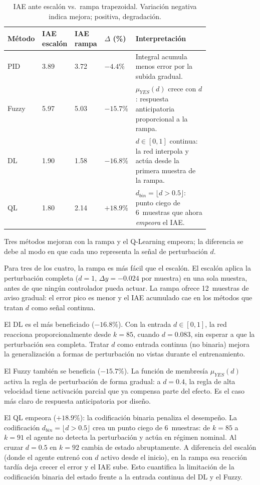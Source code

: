 \begin{table}[H]
\centering
\small
\caption{IAE ante escalón vs.\ rampa trapezoidal. Variación negativa indica mejora; positiva, degradación.}
\label{tab:robustez_rampa}
\begin{tabular}{@{}P{0.10\linewidth}P{0.12\linewidth}P{0.12\linewidth}P{0.10\linewidth}P{0.36\linewidth}@{}}
\toprule
Método & IAE escalón & IAE rampa & $\Delta$ (\%) & Interpretación \\ \midrule
PID   & 3.89 & 3.72 & $-4.4\%$  & Integral acumula menos error por la subida gradual. \\
Fuzzy & 5.97 & 5.03 & $-15.7\%$ & $\mu_{YES}(d)$ crece con $d$: respuesta anticipatoria proporcional a la rampa.\\
DL    & 1.90 & 1.58 & $-16.8\%$ & $d\in[0,1]$ continua: la red interpola y actúa desde la primera muestra de la rampa.\\
QL    & 1.80 & 2.14 & $+18.9\%$ & $d_{bin}=\lfloor d{>}0.5\rfloor$: punto ciego de 6~muestras que ahora \emph{empeora} el IAE.\\
\bottomrule
\end{tabular}
\end{table}

Tres métodos mejoran con la rampa y el Q-Learning empeora; la diferencia se debe al modo en que cada uno representa la señal de perturbación $d$.

Para tres de los cuatro, la rampa es más fácil que el escalón. El escalón aplica la perturbación completa ($d=1$, $\Delta y=-0.024$ por muestra) en una sola muestra, antes de que ningún controlador pueda actuar. La rampa ofrece 12~muestras de aviso gradual: el error pico es menor y el IAE acumulado cae en los métodos que tratan $d$ como señal continua.

El DL es el más beneficiado ($-16.8\%$). Con la entrada $d\in[0,1]$, la red reacciona proporcionalmente desde $k=85$, cuando $d=0.083$, sin esperar a que la perturbación sea completa. Tratar $d$ como entrada continua (no binaria) mejora la generalización a formas de perturbación no vistas durante el entrenamiento.

El Fuzzy también se beneficia ($-15.7\%$). La función de membresía $\mu_{YES}(d)$ activa la regla de perturbación de forma gradual: a $d=0.4$, la regla de alta velocidad tiene activación parcial que ya compensa parte del efecto. Es el caso más claro de respuesta anticipatoria por diseño.

El QL empeora ($+18.9\%$): la codificación binaria penaliza el desempeño. La codificación $d_{bin}=\lfloor d>0.5\rfloor$ crea un punto ciego de 6~muestras: de $k=85$ a $k=91$ el agente no detecta la perturbación y actúa en régimen nominal. Al cruzar $d=0.5$ en $k=92$ cambia de estado abruptamente. A diferencia del escalón (donde el agente entrenó con $d$ activo desde el inicio), en la rampa esa reacción tardía deja crecer el error y el IAE sube. Esto cuantifica la limitación de la codificación binaria del estado frente a la entrada continua del DL y el Fuzzy.

